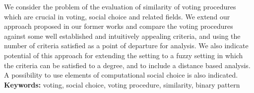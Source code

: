 
We consider the problem of the evaluation of similarity of voting procedures which are crucial in voting, social choice and related fields. We extend our approach 
proposed in our former works and compare the voting procedures against some well established and intuitively appealing 
criteria, and using the number of criteria satisfied as a point of departure for analysis. We also indicate potential of this approach for 
extending the setting to a fuzzy setting in which the criteria can be satisfied to a degree, and to include  a distance based analysis. A possibility to use elements of computational social choice is also indicated.\\[0.5cm]
\textbf{Keywords:} voting, social choice, voting procedure, similarity, binary pattern


